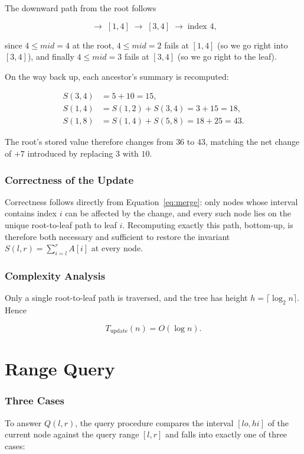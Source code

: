 \documentclass[11pt,open=any,headings=option]{scrreprt}
\begin{document}
The downward path from the root follows

\begin{equation}
[1,8] \;\rightarrow\; [1,4] \;\rightarrow\; [3,4] \;\rightarrow\; \text{index } 4,
\end{equation}

since $4 \le mid = 4$ at the root, $4 \le mid = 2$ fails at $[1,4]$ (so we go right into $[3,4]$), and finally $4 \le mid = 3$ fails at $[3,4]$ (so we go right to the leaf).

On the way back up, each ancestor's summary is recomputed:

\begin{align}
S(3,4) &= 5 + 10 = 15, \\
S(1,4) &= S(1,2) + S(3,4) = 3 + 15 = 18, \\
S(1,8) &= S(1,4) + S(5,8) = 18 + 25 = 43.
\end{align}

The root's stored value therefore changes from $36$ to $43$, matching the net change of $+7$ introduced by replacing $3$ with $10$.

\subsection{Correctness of the Update}
Correctness follows directly from Equation~\eqref{eq:merge}: only nodes whose interval contains index $i$ can be affected by the change, and every such node lies on the unique root-to-leaf path to leaf $i$. Recomputing exactly this path, bottom-up, is therefore both necessary and sufficient to restore the invariant $S(l,r) = \sum_{i=l}^r A[i]$ at every node.

\subsection{Complexity Analysis}
Only a single root-to-leaf path is traversed, and the tree has height $h = \lceil \log_2 n \rceil$. Hence

\begin{equation}
\boxed{T_{\text{update}}(n) = O(\log n)}.
\end{equation}

\chapter{Range Query}

\subsection{Three Cases}
To answer $Q(l,r)$, the query procedure compares the interval $[lo,hi]$ of the current node against the query range $[l,r]$ and falls into exactly one of three cases:
\end{document}
